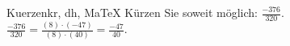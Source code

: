 \begin{MAufgabe}{Kuerzen}{kr, dh, MaTeX}
K\"urzen Sie soweit m\"oglich: $\frac{-376}{320}$.\\ 
\ifLsg\MLoesung
\quad $\frac{-376}{320}=\frac{(8)\cdot(-47)}{(8)\cdot(40)}=\frac{-47}{40}$.\else\relax\fi
 \end{MAufgabe}